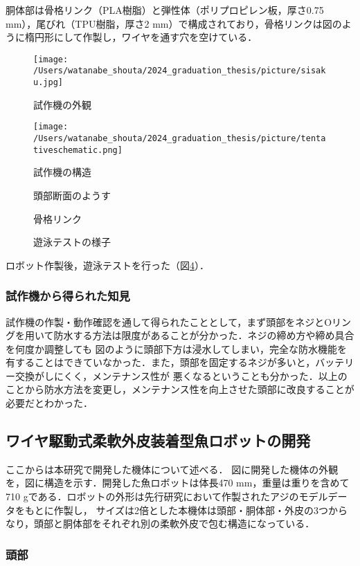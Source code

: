 胴体部は骨格リンク（PLA樹脂）と弾性体（ポリプロピレン板，厚さ0.75 mm），尾びれ（TPU樹脂，厚さ2 mm）で構成されており，骨格リンクは図のように楕円形にして作製し，ワイヤを通す穴を空けている．
\begin{figure}[htbp]
    \centering
    \texttt{[image: /Users/watanabe\_shouta/2024\_graduation\_thesis/picture/sisaku.jpg]}
    \caption{試作機の外観}
    \label{fig:sisaku}
\end{figure}
\begin{figure}[htbp]
    \centering
    \texttt{[image: /Users/watanabe\_shouta/2024\_graduation\_thesis/picture/tentativeschematic.png]}
    \caption{試作機の構造}
    \label{fig:kouzou_sisaku}
\end{figure}
\begin{figure}[H]
    \centering
     \begin{minipage}[b]{0.50\linewidth}
        \centering
        \caption{頭部断面のようす}
        \label{fig:danmen}
     \end{minipage}
     \hspace{0.05\linewidth}
     \begin{minipage}[b]{0.25\linewidth}
        \centering
        \caption{骨格リンク}
        \label{fig:link_sen}
     \end{minipage}
\end{figure}

\begin{figure}[t]
    \centering
    \caption{遊泳テストの様子}
    \label{fig:test_sisaku}
\end{figure}

ロボット作製後，遊泳テストを行った（図\ref{fig:test_sisaku}）．

\subsubsection{試作機から得られた知見}
試作機の作製・動作確認を通して得られたこととして，まず頭部をネジとOリングを用いて防水する方法は限度があることが分かった．ネジの締め方や締め具合を何度か調整しても
図のように頭部下方は浸水してしまい，完全な防水機能を有することはできていなかった．また，頭部を固定するネジが多いと，バッテリー交換がしにくく，メンテナンス性が
悪くなるということも分かった．以上のことから防水方法を変更し，メンテナンス性を向上させた頭部に改良することが必要だとわかった．

\subsection{ワイヤ駆動式柔軟外皮装着型魚ロボットの開発}
ここからは本研究で開発した機体について述べる．
図に開発した機体の外観を，図に構造を示す．開発した魚ロボットは体長470 mm，重量は重りを含めて710 gである．ロボットの外形は先行研究において作製されたアジのモデルデータをもとに作製し，
サイズは2倍とした本機体は頭部・胴体部・外皮の3つからなり，頭部と胴体部をそれぞれ別の柔軟外皮で包む構造になっている．
\subsubsection{頭部}